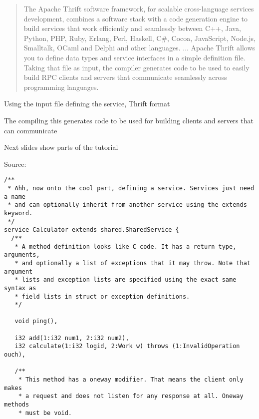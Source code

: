 \documentclass[Screen16to9,17pt]{foils}
\begin{document}
\begin{quote}
  The Apache Thrift software framework, for scalable cross-language services development, combines a software stack with a code generation engine to build services that work efficiently and seamlessly between C++, Java, Python, PHP, Ruby, Erlang, Perl, Haskell, C\#, Cocoa, JavaScript, Node.js, Smalltalk, OCaml and Delphi and other languages.
...
Apache Thrift allows you to define data types and service interfaces in a simple definition file. Taking that file as input, the compiler generates code to be used to easily build RPC clients and servers that communicate seamlessly across programming languages.
\end{quote}

\begin{list2}
\item Using the input file defining the service, Thrift format
\item The compiling this generates code to be used for building clients and servers that can communicate
\item Next slides show parts of the tutorial 
\end{list2}
Source: {\footnotesize\\
}





\begin{verbatim}
/**
 * Ahh, now onto the cool part, defining a service. Services just need a name
 * and can optionally inherit from another service using the extends keyword.
 */
service Calculator extends shared.SharedService {
  /**
   * A method definition looks like C code. It has a return type, arguments,
   * and optionally a list of exceptions that it may throw. Note that argument
   * lists and exception lists are specified using the exact same syntax as
   * field lists in struct or exception definitions.
   */

   void ping(),

   i32 add(1:i32 num1, 2:i32 num2),
   i32 calculate(1:i32 logid, 2:Work w) throws (1:InvalidOperation ouch),

   /**
    * This method has a oneway modifier. That means the client only makes
    * a request and does not listen for any response at all. Oneway methods
    * must be void.
\end{verbatim}
\end{document}
